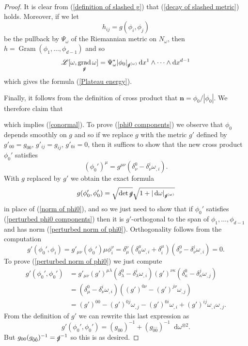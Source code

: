 \documentclass[reqno,12pt,letterpaper]{amsart}
\newcommand*\dif{\mathop{}\!\mathrm{d}}
\DeclareMathOperator{\Gram}{Gram}
\DeclareMathOperator{\grad}{grad}
\newcommand{\Lagrange}{\mathscr L}
\newcommand{\normal}{\mathbf n}
\theoremstyle{definition}
\numberwithin{equation}{section}
\begin{document}
\begin{proof}
It is clear from (\ref{definition of slashed g}) that (\ref{decay of slashed metric}) holds.
Moreover, if we let
$$h_{ij} = g(\phi_i, \phi_j)$$
be the pullback by $\Psi_\omega$ of the Riemannian metric on $N_\omega$, then $h = \Gram(\phi_1, \dots, \phi_{d - 1})$ and so
$$\Lagrange[\omega, \grad_{\slashed g} \omega] = \Psi_\omega^* |\phi_0|_{\slashed g^{(\omega)}} \dif x^1 \wedge \cdots \wedge \dif x^{d - 1}$$
which gives the formula (\ref{Plateau energy}).

Finally, it follows from the definition of cross product that $\normal = \phi_0/|\phi_0|$.
We therefore claim that

which implies (\ref{conormal}). To prove (\ref{phi0 components}) we observe that $\phi_0$ depends smoothly on $g$ and so if we replace $g$ with the metric $g'$ defined by $g'_{00} = g_{00}$, $g'_{ij} = g_{ij}$, $g'_{0i} = 0$, then it suffices to show that the new cross product $\phi_0'$ satisfies
\begin{equation}\label{perturbed phi0 components}
(\phi_0')^\mu = g^{\mu\nu}(\delta_\nu^0 - \delta_\nu^i\omega_{,i}).
\end{equation}
With $g$ replaced by $g'$ we obtain the exact formula
\begin{equation}\label{perturbed norm of phi0}
g(\phi_0', \phi_0') = \sqrt{\det \slashed g} \sqrt{1 + |\dif \omega|_{\slashed g^{(\omega)}}}
\end{equation}
in place of (\ref{norm of phi0}), and so we just need to show that if $\phi_0'$ satisfies (\ref{perturbed phi0 components}) then it is $g'$-orthogonal to the span of $\phi_1, \dots, \phi_{d - 1}$ and has norm (\ref{perturbed norm of phi0}).
Orthogonality follows from the computation
$$g'(\phi_0', \phi_i) = g'_{\mu\nu} (\phi_0')\mu \phi_i^\nu = \delta_\mu^\nu (\delta_0^\mu \omega_{,i} + \delta_i^\mu) (\delta_\nu^0 - \delta_\nu^i \omega_{,i}) = 0.$$
To prove (\ref{perturbed norm of phi0}) we just compute
\begin{align*}
g'(\phi_0', \phi_0')
&= g'_{\mu \nu} (g')^{\mu \lambda}(\delta^0_\lambda - \delta^i_\lambda \omega_{,i}) (g')^{\nu \kappa}(\delta_\kappa^0 - \delta_\kappa^j \omega_{,j})\\
&= (\delta_\mu^0 - \delta_\nu^i \omega_{,i})((g')^{0 \nu} - (g')^{j \nu} \omega_{,j})\\
&= (g')^{00} - (g')^{0j} \omega_{,j} - (g')^{0i} \omega_{,i} + (g')^{ij} \omega_{,i} \omega_{,j}.
\end{align*}
From the definition of $g'$ we can rewrite this last expression as
$$g'(\phi_0', \phi_0') = (g_{00})^{-1} + (g_{\hat 0 \hat 0})^{-1} \dif \omega^{\otimes 2}.$$
But $g_{00} (g_{\hat 0 \hat 0})^{-1} = \slashed g^{-1}$ so this is as desired.
\end{proof}
\end{document}
